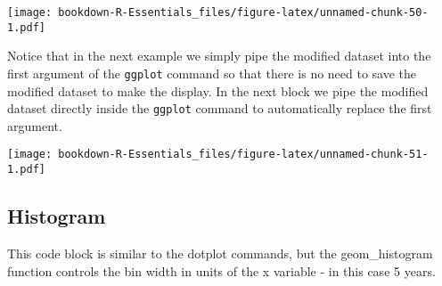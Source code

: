 \documentclass[
]{book}
\newenvironment{Shaded}{\begin{snugshade}}{\end{snugshade}}
\newcommand{\DataTypeTok}[1]{\textcolor[rgb]{0.13,0.29,0.53}{#1}}
\newcommand{\DecValTok}[1]{\textcolor[rgb]{0.00,0.00,0.81}{#1}}
\newcommand{\KeywordTok}[1]{\textcolor[rgb]{0.13,0.29,0.53}{\textbf{#1}}}
\newcommand{\NormalTok}[1]{#1}
\newcommand{\OperatorTok}[1]{\textcolor[rgb]{0.81,0.36,0.00}{\textbf{#1}}}
\newcommand{\StringTok}[1]{\textcolor[rgb]{0.31,0.60,0.02}{#1}}
\begin{document}
\texttt{[image: bookdown-R-Essentials\_files/figure-latex/unnamed-chunk-50-1.pdf]}

Notice that in the next example we simply pipe the modified dataset into the first argument of the \texttt{ggplot} command so that there is no need to save the modified dataset to make the display. In the next block we pipe the modified dataset directly inside the \texttt{ggplot} command to automatically replace the first argument.

\begin{Shaded}
\end{Shaded}

\texttt{[image: bookdown-R-Essentials\_files/figure-latex/unnamed-chunk-51-1.pdf]}

\hypertarget{histogram}{%
\subsection{Histogram}\label{histogram}}

This code block is similar to the dotplot commands, but the geom\_histogram function controls the bin width in units of the x variable - in this case 5 years.

\begin{Shaded}
\end{Shaded}
\end{document}

